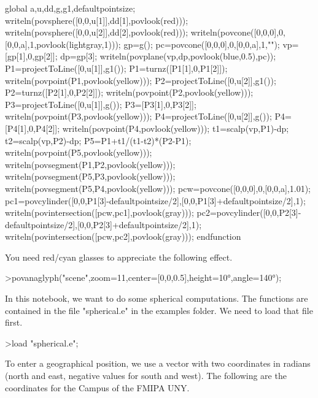 \documentclass{article}
\begin{document}
\begin{eulernotebook}
\begin{eulercomment}
\begin{eulercomment}
\begin{eulercomment}
\begin{eulercomment}
\begin{eulercomment}
\begin{eulercomment}
\begin{eulercomment}
\begin{eulercomment}
\begin{eulerudf}
  global a,u,dd,g,g1,defaultpointsize;
  writeln(povsphere([0,0,u[1]],dd[1],povlook(red)));
  writeln(povsphere([0,0,u[2]],dd[2],povlook(red)));
  writeln(povcone([0,0,0],0,[0,0,a],1,povlook(lightgray,1)));
  gp=g();
  pc=povcone([0,0,0],0,[0,0,a],1,"");
  vp=[gp[1],0,gp[2]]; dp=gp[3];
  writeln(povplane(vp,dp,povlook(blue,0.5),pc));
  P1=projectToLine([0,u[1]],g1()); P1=turnz([P1[1],0,P1[2]]);
  writeln(povpoint(P1,povlook(yellow)));
  P2=projectToLine([0,u[2]],g1()); P2=turnz([P2[1],0,P2[2]]);
  writeln(povpoint(P2,povlook(yellow)));
  P3=projectToLine([0,u[1]],g()); P3=[P3[1],0,P3[2]];
  writeln(povpoint(P3,povlook(yellow)));
  P4=projectToLine([0,u[2]],g()); P4=[P4[1],0,P4[2]];
  writeln(povpoint(P4,povlook(yellow)));
  t1=scalp(vp,P1)-dp; t2=scalp(vp,P2)-dp; P5=P1+t1/(t1-t2)*(P2-P1);
  writeln(povpoint(P5,povlook(yellow)));
  writeln(povsegment(P1,P2,povlook(yellow)));
  writeln(povsegment(P5,P3,povlook(yellow)));
  writeln(povsegment(P5,P4,povlook(yellow)));
  pcw=povcone([0,0,0],0,[0,0,a],1.01);
  pc1=povcylinder([0,0,P1[3]-defaultpointsize/2],[0,0,P1[3]+defaultpointsize/2],1);
  writeln(povintersection([pcw,pc1],povlook(gray)));
  pc2=povcylinder([0,0,P2[3]-defaultpointsize/2],[0,0,P2[3]+defaultpointsize/2],1);
  writeln(povintersection([pcw,pc2],povlook(gray)));
  endfunction
\end{eulerudf}
\begin{eulercomment}
You need red/cyan glasses to appreciate the following effect.
\end{eulercomment}
\begin{eulerprompt}
>povanaglyph("scene",zoom=11,center=[0,0,0.5],height=10°,angle=140°);
\end{eulerprompt}
\begin{eulercomment}
In this notebook, we want to do some spherical computations. The functions are contained in
the file "spherical.e" in the examples folder. We need to load that file first.
\end{eulercomment}
\begin{eulerprompt}
>load "spherical.e";
\end{eulerprompt}
\begin{eulercomment}
To enter a geographical position, we use a vector with two coordinates in radians (north and
east, negative values for south and west). The following are the coordinates for the Campus
of the FMIPA UNY.
\end{eulercomment}
\begin{eulerprompt}

\end{eulerprompt}
\end{eulercomment}
\end{eulercomment}
\end{eulercomment}
\end{eulercomment}
\end{eulercomment}
\end{eulercomment}
\end{eulercomment}
\end{eulercomment}
\end{eulernotebook}
\end{document}
